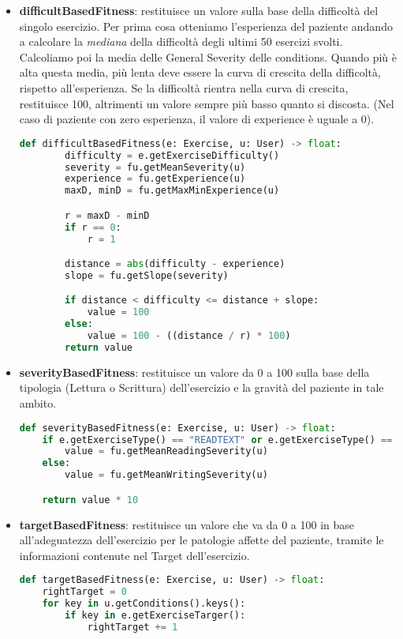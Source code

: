 \documentclass{article}
\begin{document}
\begin{itemize}

\item\textbf{difficultBasedFitness}: restituisce un valore sulla base della difficoltà del singolo esercizio. Per prima cosa otteniamo l'esperienza del paziente andando a calcolare la \textit{mediana} della difficoltà degli ultimi 50 esercizi svolti. Calcoliamo poi la media delle General Severity delle conditions. Quando più è alta questa media, più lenta deve essere la curva di crescita della difficoltà, rispetto all'esperienza. Se la difficoltà rientra nella curva di crescita, restituisce 100, altrimenti un valore sempre più basso quanto si discosta. (Nel caso di paziente con zero esperienza, il valore di experience è uguale a 0).
\begin{lstlisting}[language = Python]
    def difficultBasedFitness(e: Exercise, u: User) -> float:
        difficulty = e.getExerciseDifficulty()
        severity = fu.getMeanSeverity(u)
        experience = fu.getExperience(u)
        maxD, minD = fu.getMaxMinExperience(u)

        r = maxD - minD
        if r == 0:
            r = 1

        distance = abs(difficulty - experience)
        slope = fu.getSlope(severity)

        if distance < difficulty <= distance + slope:
            value = 100
        else:
            value = 100 - ((distance / r) * 100)
        return value
\end{lstlisting}


\item\textbf{severityBasedFitness}: restituisce un valore da 0 a 100 sulla base della tipologia (Lettura o Scrittura) dell'esercizio e la gravità del paziente in tale ambito.
\begin{lstlisting}[language = Python]
    def severityBasedFitness(e: Exercise, u: User) -> float:
    if e.getExerciseType() == "READTEXT" or e.getExerciseType() == "TEXTTOIMAGES" or e.getExerciseType() == "READIMAGES":
        value = fu.getMeanReadingSeverity(u)
    else:
        value = fu.getMeanWritingSeverity(u)

    return value * 10
\end{lstlisting}



\item\textbf{targetBasedFitness}: restituisce un valore che va da 0 a 100 in base all'adeguatezza dell'esercizio per le patologie affette del paziente, tramite le informazioni contenute nel Target dell'esercizio.
\begin{lstlisting}[language = Python]
    def targetBasedFitness(e: Exercise, u: User) -> float:
    rightTarget = 0
    for key in u.getConditions().keys():
        if key in e.getExerciseTarger():
            rightTarget += 1


\end{lstlisting}
\end{itemize}
\end{document}
